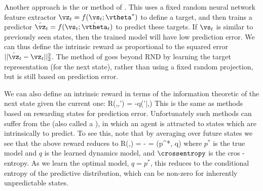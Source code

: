 Another approach
is the  or 
method of \citep{Burda2018}.
This uses a fixed random neural network feature extractor
$\vz_t=f(\vs_t;\vtheta^*)$ to define a target,
and then trains a predictor $\hat{\vz}_t=f(\vs_t;\hat{\vtheta}_t)$
to predict these targets.
If $\vs_t$ is similar to previously seen states,
then the trained model will have low prediction error.
We can thus define the intrinsic reward as proportional
to the squared error $||\hat{\vz}_t - \vz_t||_2^2$.
The  method of
\citep{Guo2022} goes beyond RND by learning
the target representation (for the next state),
rather than using a fixed random projection,
but is still based on prediction error.



We can also define an intrinsic reward in terms
of the information theoretic 
of the next state given the current one:
\be
R(\vs,\va,\vs') = -\log q(\vs'|\vs,\va)
\ee
This is the same as methods based on
rewarding states for prediction error.
Unfortunately such methods
can suffer from 
the 
(also called a ),
in which an agent is attracted to states 
which are intrinsically to predict.
To see this, note that by averaging
over future states we see that the above reward reduces to
\be
R(\vs,\va) = -
= \crossentropy(p^*, q)
\ee
where $p^*$ is the true model and $q$ is the learned dynamics model,
and $\crossentropy$ is the cros -entropy.
As we learn the optimal model, $q=p^*$,
this reduces to the conditional
entropy of the predictive distribution,
which can be non-zero for inherently unpredictable states.

